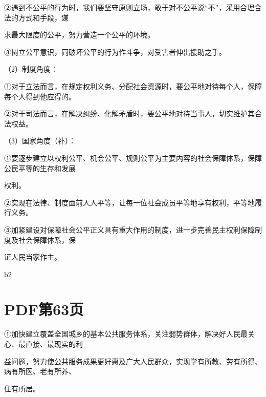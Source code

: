\documentclass[lang=cn,11pt]{elegantbook}
\newcommand{\daofasym}[1]{{\daofasymbolfont #1}}
\newcommand{\daofasym}[1]{#1}
\begin{document}
\daofasym{②}遇到不公平的行为时，我们要坚守原则立场，敢于对不公平说“不”，采用合理合法的方式和手段，谋\par

求最大限度的公平，努力营造一个公平的环境。\par

\daofasym{③}树立公平意识，同破坏公平的行为作斗争，对受害者伸出援助之手。\par

（2）制度角度：\par

\daofasym{①}对于立法而言，在规定权利义务、分配社会资源时，要公平地对待每个人，保障每个人得到他应得的。\par

\daofasym{②}对于司法而言，在解决纠纷、化解矛盾时，要公平地对待当事人，切实维护其合法权益。\par

（3）国家角度（补）：\par

\daofasym{①}要逐步建立以权利公平、机会公平、规则公平为主要内容的社会保障体系，保障公民平等的生存和发展\par

权利。\par

\daofasym{②}实现在法律、制度面前人人平等，让每一位社会成员平等地享有权利，平等地履行义务。\par

\daofasym{③}加紧建设对保障社会公平正义具有重大作用的制度，进一步完善民主权利保障制度及社会保障体系，保\par

证人民当家作主。\par

b2\par


\section*{PDF第63页}

\daofasym{①}加快建立覆盖全国城乡的基本公共服务体系，关注弱势群体，解决好人民最关心、最直接、最现实的利\par

益问题，努力使公共服务成果更好惠及广大人民群众，实现学有所教、劳有所得、病有所医、老有所养、\par

住有所居。\par
\end{document}
